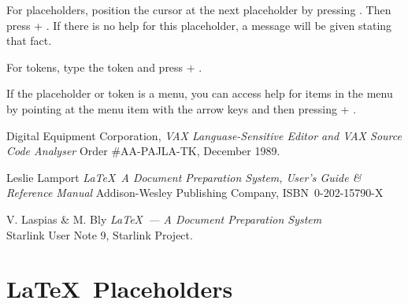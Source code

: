 For placeholders, position the cursor at the next placeholder by pressing 
\nolinebreak. Then press \gold + \help. If there is no help for this
placeholder, a message will be given stating that fact.

For tokens, type the token and press \gold + \help.

If the placeholder or token is a menu, you can access help for items in the
menu by pointing at the menu item with the arrow keys and then pressing \gold +
\help. 

\begin{thebibliography}{99}

 Digital Equipment Corporation, 
{\em VAX Languase-Sensitive Editor and VAX Source Code Analyser}
Order \#AA-PAJLA-TK, December 1989.

 Leslie Lamport {\em \LaTeX\ A Document Preparation System, 
User's Guide \& Reference Manual \/} Addison-Wesley Publishing Company,
ISBN~0-202-15790-X

 V. Laspias \& M. Bly {\em \LaTeX\ --- A Document Preparation
System} \\
Starlink User Note 9, Starlink Project.

\end{thebibliography}

\newpage
\appendix
\section{\LaTeX\ Placeholders}\label{place}

